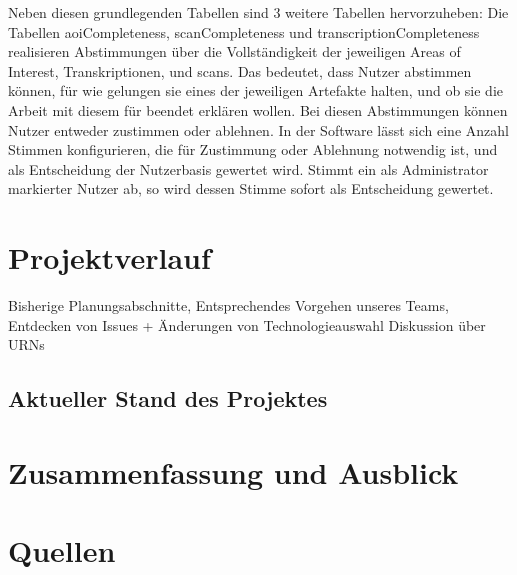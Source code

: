 \documentclass{article}
\begin{document}
Neben diesen grundlegenden Tabellen sind 3 weitere Tabellen hervorzuheben:
Die Tabellen aoiCompleteness, scanCompleteness und transcriptionCompleteness
realisieren Abstimmungen über die Vollständigkeit der jeweiligen Areas of Interest, Transkriptionen, und scans.
Das bedeutet, dass Nutzer abstimmen können,
für wie gelungen sie eines der jeweiligen Artefakte halten,
und ob sie die Arbeit mit diesem für beendet erklären wollen.
Bei diesen Abstimmungen können Nutzer entweder zustimmen oder ablehnen.
In der Software lässt sich eine Anzahl Stimmen konfigurieren,
die für Zustimmung oder Ablehnung notwendig ist,
und als Entscheidung der Nutzerbasis gewertet wird.
Stimmt ein als Administrator markierter Nutzer ab,
so wird dessen Stimme sofort als Entscheidung gewertet.

\section{Projektverlauf}
Bisherige Planungsabschnitte,
Entsprechendes Vorgehen unseres Teams,
Entdecken von Issues + Änderungen von Technologieauswahl
Diskussion über URNs

\subsection{Aktueller Stand des Projektes}

\section{Zusammenfassung und Ausblick}

\section*{Quellen}
  \printbibliography[%
    heading=bibintoc, %
  ]
\end{document}
